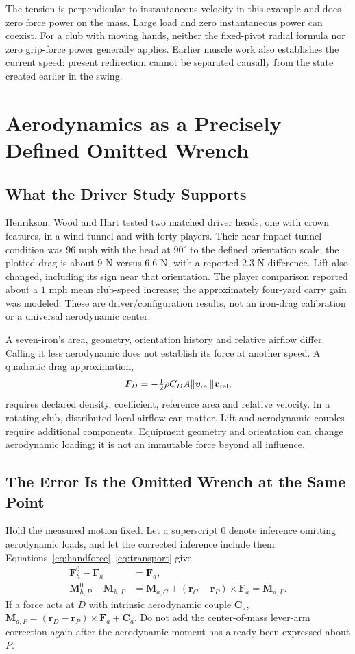 \documentclass[11pt,a4paper]{article}
\newcommand{\vect}[1]{\boldsymbol{#1}}
\begin{document}
The tension is perpendicular to instantaneous velocity in this example and does zero force power on the mass. Large load and zero instantaneous power can coexist. For a club with moving hands, neither the fixed-pivot radial formula nor zero grip-force power generally applies. Earlier muscle work also establishes the current speed: present redirection cannot be separated causally from the state created earlier in the swing.

\section{Aerodynamics as a Precisely Defined Omitted Wrench}
\subsection{What the Driver Study Supports}
Henrikson, Wood and Hart \cite{henrikson} tested two matched driver heads, one with crown features, in a wind tunnel and with forty players. Their near-impact tunnel condition was $96$ mph with the head at $90^\circ$ to the defined orientation scale; the plotted drag is about $9$ N versus $6.6$ N, with a reported $2.3$ N difference. Lift also changed, including its sign near that orientation. The player comparison reported about a $1$ mph mean club-speed increase; the approximately four-yard carry gain was modeled. These are driver/configuration results, not an iron-drag calibration or a universal aerodynamic center.

A seven-iron's area, geometry, orientation history and relative airflow differ. Calling it less aerodynamic does not establish its force at another speed. A quadratic drag approximation,
\begin{equation}
\vect F_D=-\tfrac12\rho C_D A\|\vect v_{\rm rel}\|\vect v_{\rm rel},
\end{equation}
requires declared density, coefficient, reference area and relative velocity. In a rotating club, distributed local airflow can matter. Lift and aerodynamic couples require additional components. Equipment geometry and orientation can change aerodynamic loading; it is not an immutable force beyond all influence.

\subsection{The Error Is the Omitted Wrench at the Same Point}
Hold the measured motion fixed. Let a superscript $0$ denote inference omitting aerodynamic loads, and let the corrected inference include them. Equations~\ref{eq:handforce}--\ref{eq:transport} give
\begin{align}
\vect F_h^0-\vect F_h&=\vect F_a,\\
\vect M_{h,P}^0-\vect M_{h,P}&=\vect M_{a,C}
 +(\vect r_C-\vect r_P)\times\vect F_a
 =\vect M_{a,P}.\label{eq:aerobias}
\end{align}
If a force acts at $D$ with intrinsic aerodynamic couple $\vect C_a$,
$\vect M_{a,P}=(\vect r_D-\vect r_P)\times\vect F_a+\vect C_a$.
Do not add the center-of-mass lever-arm correction again after the aerodynamic moment has already been expressed about $P$.
\end{document}
